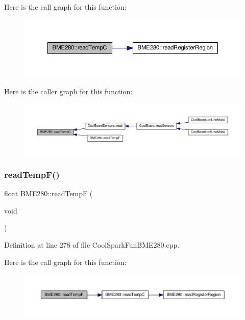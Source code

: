 Here is the call graph for this function\+:\nopagebreak
\begin{figure}[H]
\begin{center}
\leavevmode
\includegraphics[width=350pt]{class_b_m_e280_afffdd1d7ded9e1f92200e70669019d97_cgraph}
\end{center}
\end{figure}
Here is the caller graph for this function\+:\nopagebreak
\begin{figure}[H]
\begin{center}
\leavevmode
\includegraphics[width=350pt]{class_b_m_e280_afffdd1d7ded9e1f92200e70669019d97_icgraph}
\end{center}
\end{figure}
\mbox{\label{class_b_m_e280_a9648b496f6b4700550782a715a98b3c7}} 
\subsubsection{\texorpdfstring{read\+Temp\+F()}{readTempF()}}
{\footnotesize\ttfamily float B\+M\+E280\+::read\+TempF (\begin{DoxyParamCaption}\item[{void}]{ }\end{DoxyParamCaption})}



Definition at line 278 of file Cool\+Spark\+Fun\+B\+M\+E280.\+cpp.

Here is the call graph for this function\+:\nopagebreak
\begin{figure}[H]
\begin{center}
\leavevmode
\includegraphics[width=350pt]{class_b_m_e280_a9648b496f6b4700550782a715a98b3c7_cgraph}
\end{center}
\end{figure}
\mbox{\label{class_b_m_e280_aeec5deb6daace6ae390108b4210e9df7}} 
